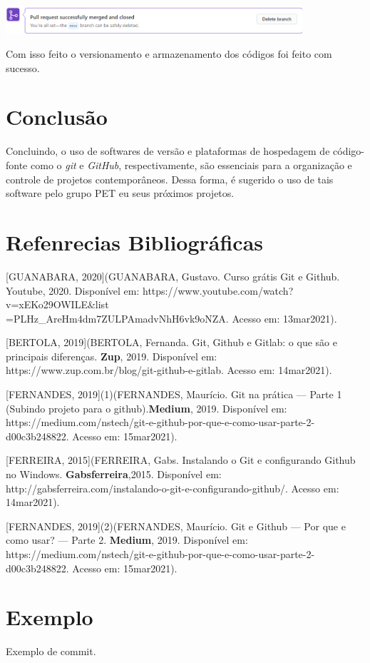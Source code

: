 \documentclass{article}
\begin{document}
\includegraphics[width = 11cm]{images/final.png}

Com isso feito o versionamento e armazenamento dos códigos foi feito com sucesso.

\section*{Conclusão}

\hspace{4mm}Concluindo, o uso de softwares de versão e plataformas de hospedagem de código-fonte como o \textit{git} e \textit{GitHub}, respectivamente, são essenciais para a organização e controle de projetos contemporâneos. Dessa forma, é sugerido o uso de tais software pelo grupo PET eu seus próximos projetos.

\section*{Refenrecias Bibliográficas}

[GUANABARA, 2020](GUANABARA, Gustavo. Curso grátis Git e Github. Youtube, 2020. Disponível em: https://www.youtube.com/watch?v=xEKo29OWILE&list\\=PLHz_AreHm4dm7ZULPAmadvNhH6vk9oNZA. Acesso em: 13mar2021).

[BERTOLA, 2019](BERTOLA, Fernanda. Git, Github e Gitlab: o que são e principais diferenças. \textbf{Zup}, 2019. Disponível em: https://www.zup.com.br/blog/git-github-e-gitlab. Acesso em: 14mar2021).

[FERNANDES, 2019](1)(FERNANDES, Maurício. Git na prática — Parte 1 (Subindo projeto para o github).\textbf{Medium}, 2019. Disponível em: https://medium.com/nstech/git-e-github-por-que-e-como-usar-parte-2-d00c3b248822. Acesso em: 15mar2021).

[FERREIRA, 2015](FERREIRA, Gabs. Instalando o Git e configurando Github no Windows. \textbf{Gabsferreira},2015. Disponível em: http://gabsferreira.com/instalando-o-git-e-configurando-github/. Acesso em: 14mar2021).

[FERNANDES, 2019](2)(FERNANDES, Maurício. Git e Github — Por que e como usar? — Parte 2.
\textbf{Medium}, 2019. Disponível em: https://medium.com/nstech/git-e-github-por-que-e-como-usar-parte-2-d00c3b248822. Acesso em: 15mar2021).


\section*{Exemplo}

Exemplo de commit.
\end{document}
